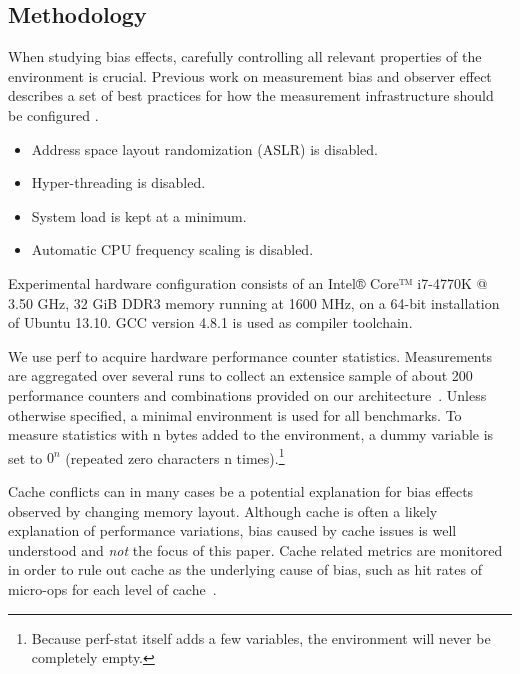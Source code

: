 \documentclass[a4paper,10pt,twocolumn,twoside]{article}
\begin{document}
\subsection{Methodology}
When studying bias effects, carefully controlling all relevant properties of the environment is crucial. 
Previous work on measurement bias and observer effect describes a set of best practices for how the measurement infrastructure should be configured \cite{Mytkowicz:2009:WrongData, Mytkowicz:2008:OE&MB}. 
\begin{itemize}
  \item Address space layout randomization (ASLR) is disabled.
  \item Hyper-threading is disabled.
  \item System load is kept at a minimum.
  \item Automatic CPU frequency scaling is disabled.
\end{itemize}
Experimental hardware configuration consists of an Intel® Core™ i7-4770K @ 3.50 GHz, 32 GiB DDR3 memory running at 1600 MHz, on a 64-bit installation of Ubuntu 13.10. GCC version 4.8.1 is used as compiler toolchain.

We use perf to acquire hardware performance counter statistics.
Measurements are aggregated over several runs to collect an extensice sample of about 200 performance counters and combinations provided on our architecture~\cite{Intel:2013:Volume3B}. 
Unless otherwise specified, a minimal environment is used for all benchmarks. 
To measure statistics with n bytes added to the environment, a dummy variable is set to \(0^{n}\) (repeated zero characters n times).\footnote{Because perf-stat itself adds a few variables, the environment will never be completely empty.}

Cache conflicts can in many cases be a potential explanation for bias effects observed by changing memory layout.
Although cache is often a likely explanation of performance variations, bias caused by cache issues is well understood and \emph{not} the focus of this paper.
Cache related metrics are monitored in order to rule out cache as the underlying cause of bias, such as hit rates of micro-ops for each level of cache~\cite{Intel:2012:OptimizationManual}.
\fi
\end{document}
